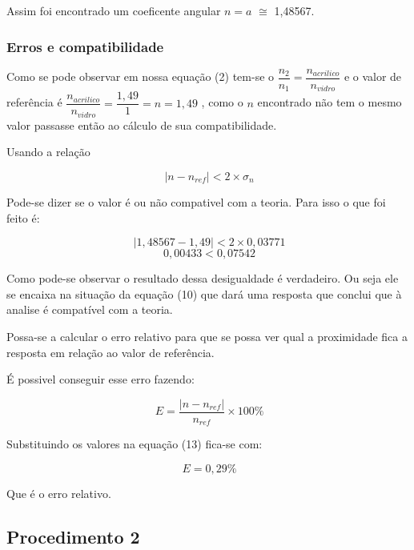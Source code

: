 \documentclass [a4paper, 12pt]{article}
\begin{document}
Assim foi encontrado um coeficente angular $n = a$ $\cong$  1,48567.

\subsubsection{Erros e compatibilidade}

Como se pode observar em nossa equação (2) tem-se o $\dfrac{n_2}{n_1} = \dfrac{n_{acrilico}}{n_{vidro}}$ e o valor de referência é $\dfrac{n_{acrilico}}{n_{vidro}} = \dfrac{1,49}{1} = n = 1,49$ , como o $n$ encontrado não tem o mesmo valor passasse então ao cálculo de sua compatibilidade.

Usando a relação

\begin{equation}
  \ \Big|n - n_{ref}\Big| < 2\times\sigma_n
\end{equation}

Pode-se dizer se o valor é ou não compativel com a teoria. Para isso o que foi feito é:

\begin{equation}
  \ \Big|1,48567 - 1,49\Big| < 2\times0,03771
\end{equation}
\begin{equation}
  \  0,00433 < 0,07542
\end{equation}

Como pode-se observar o resultado dessa desigualdade é verdadeiro. Ou seja ele se encaixa na situação da equação (10) que dará uma resposta que conclui que à analise é compatível com a teoria.

Possa-se a calcular o erro relativo para que se possa ver qual a proximidade fica a resposta em relação ao valor de referência.

É possivel conseguir esse erro fazendo:

\begin{equation}
  \  E = \dfrac{\Big|n - n_{ref}\Big|}{n_{ref}} \times 100 \%
\end{equation}

Substituindo os valores na equação (13) fica-se com:

\begin{equation}
  \  E = 0,29\%
\end{equation}

Que é o erro relativo.

\subsection{Procedimento 2}
\end{document}
